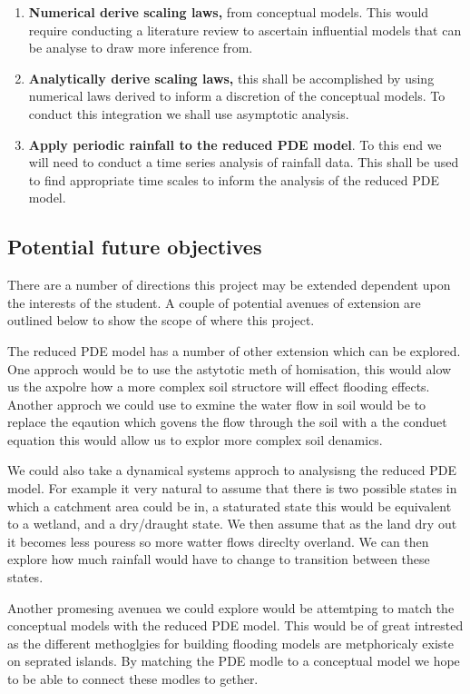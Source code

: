 \documentclass[11pt]{article}
\begin{document}
\begin{enumerate}
    \item \textbf{Numerical derive scaling laws,} from conceptual models. This would require conducting a literature review to ascertain influential models that can be analyse to draw more inference from.
    \item \textbf{Analytically derive scaling laws,} this shall be accomplished by using numerical laws derived to inform a discretion of the conceptual models. To conduct this integration we shall use asymptotic analysis.
    \item \textbf{Apply periodic rainfall to the reduced PDE model}. To this end we will need to conduct a time series analysis of rainfall data. This shall be used to find appropriate time scales to inform the analysis of the reduced PDE model.
\end{enumerate}

\subsection{Potential future objectives}

There are a number of directions this project may be extended dependent upon the interests of the student. A couple of potential avenues of extension are outlined below to show the scope of where this project.

The reduced PDE model has a number of other extension which can be explored. One approch would be to use the astytotic meth of homisation, this would alow us the axpolre how a more complex soil structore will effect flooding effects. Another approch we could use to exmine the water flow in soil would be to replace the eqaution which govens the flow through the soil with a the conduet equation this would allow us to explor more complex soil denamics.

We could also take a dynamical systems approch to analysisng the reduced PDE model. For example it very natural to assume that there is two possible states in which a catchment area could be in, a staturated state this would be equivalent to a wetland, and a dry/draught state. We then assume that as the land dry out it becomes less pouress so more watter flows direclty overland. We can then explore how much rainfall would have to change to transition between these states.

Another promesing avenuea we could explore would be attemtping to match the conceptual models with the reduced PDE model. This would be of great intrested as the different methoglgies for building flooding models are metphoricaly existe on seprated islands. By matching the PDE modle to a conceptual model we hope to be able to connect these modles to gether.
\end{document}
